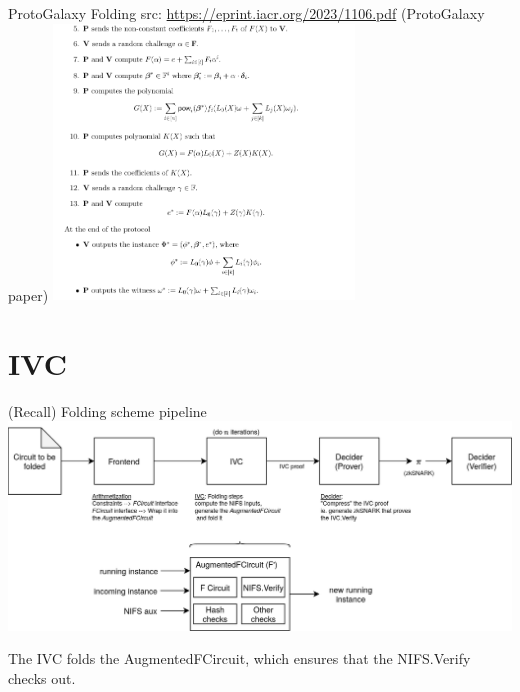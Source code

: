 \documentclass[t]{beamer} \usefonttheme[onlymath]{serif}
\begin{document}
\begin{frame}{ProtoGalaxy Folding}
  {\tiny src: \href{https://eprint.iacr.org/2023/1106.pdf}{https://eprint.iacr.org/2023/1106.pdf} (ProtoGalaxy paper)}
  \includegraphics[width=8cm]{./imgs/protogalaxy-screenshot}
\end{frame}

\section{IVC}

\begin{frame}{(Recall) Folding scheme pipeline}
  \includegraphics[width=\textwidth]{folding-scheme-pipeline}

  \vspace{0.5cm}
  {\scriptsize
  The IVC folds the AugmentedFCircuit, which ensures that the NIFS.Verify checks out.
  }
\end{frame}

\end{document}
